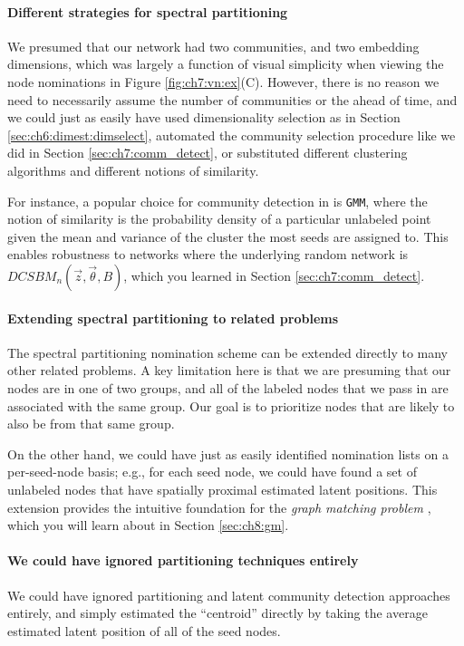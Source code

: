 \paragraph*{Different strategies for spectral partitioning}

We presumed that our network had two communities, and two embedding dimensions, which was largely a function of visual simplicity when viewing the node nominations in Figure \ref{fig:ch7:vn:ex}(C). However, there is no reason we need to necessarily assume the number of communities or the ahead of time, and we could just as easily have used dimensionality selection as in Section \ref{sec:ch6:dimest:dimselect}, automated the community selection procedure like we did in Section \ref{sec:ch7:comm_detect}, or substituted different clustering algorithms and different notions of similarity.

For instance, a popular choice for community detection in \cite{Yoder2018Feb} is \texttt{GMM}, where the notion of similarity is the probability density of a particular unlabeled point given the mean and variance of the cluster the most seeds are assigned to. This enables robustness to networks where the underlying random network is $DCSBM_n(\vec z, \vec \theta, B)$, which you learned in Section \ref{sec:ch7:comm_detect}.

\paragraph*{Extending spectral partitioning to related problems}

The spectral partitioning nomination scheme can be extended directly to many other related problems. A key limitation here is that we are presuming that our nodes are in one of two groups, and all of the labeled nodes that we pass in are associated with the same group. Our goal is to prioritize nodes that are likely to also be from that same group. 

On the other hand, we could have just as easily identified nomination lists on a per-seed-node basis; e.g., for each seed node, we could have found a set of unlabeled nodes that have spatially proximal estimated latent positions. This extension provides the intuitive foundation for the \textit{graph matching problem} \cite{Fishkind2015Sep, Fishkind2019Mar}, which you will learn about in Section \ref{sec:ch8:gm}.

\paragraph*{We could have ignored partitioning techniques entirely}

We could have ignored partitioning and latent community detection approaches entirely, and simply estimated the ``centroid'' directly by taking the average estimated latent position of all of the seed nodes.

\newpage